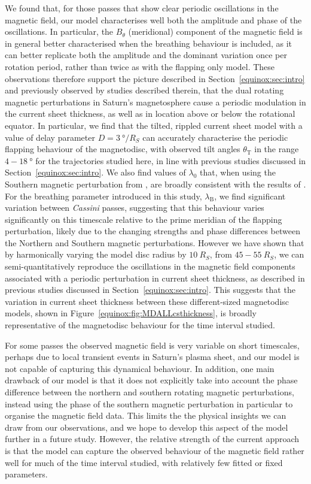 We found that, for those passes that show clear periodic oscillations in the magnetic field, our model characterises well both the amplitude and phase of the oscillations. In particular, the $B_\theta$ (meridional) component of the magnetic field is in general better characterised when the breathing behaviour is included, as it can better replicate both the amplitude and the dominant variation once per rotation period, rather than twice as with the flapping only model. These observations therefore support the picture described in Section~\ref{equinox:sec:intro} and previously observed by studies described therein, that the dual rotating magnetic perturbations in Saturn's magnetosphere cause a periodic modulation in the current sheet thickness, as well as in location above or below the rotational equator. In particular, we find that the \citet{arridge2011} tilted, rippled current sheet model with a value of delay parameter $D = \SI{3}{\degree/R_S}$ can accurately characterise the periodic flapping behaviour of the magnetodisc, with observed tilt angles $\theta_\mathrm{T}$ in the range $4-\SI{18}{\degree}$ for the trajectories studied here, in line with previous studies discussed in Section~\ref{equinox:sec:intro}. We also find values of $\lambda_0$ that, when using the Southern magnetic perturbation from \citet{andrews2012}, are broadly consistent with the results of \citet{arridge2011}. For the breathing parameter introduced in this study, $\lambda_\mathrm{B}$, we find significant variation between \textit{Cassini }passes, suggesting that this behaviour varies significantly on this timescale relative to the prime meridian of the flapping perturbation, likely due to the changing strengths and phase differences between the Northern and Southern magnetic perturbations. However we have shown that by harmonically varying the model disc radius by $\SI{10}{R_S}$, from $45-\SI{55}{R_S}$, we can semi-quantitatively reproduce the oscillations in the magnetic field components associated with a periodic perturbation in current sheet thickness, as described in previous studies discussed in Section~\ref{equinox:sec:intro}. This suggests that the variation in current sheet thickness between these different-sized magnetodisc models, shown in Figure~\ref{equinox:fig:MDALLcsthickness}, is broadly representative of the magnetodisc behaviour for the time interval studied.

For some passes the observed magnetic field is very variable on short timescales, perhaps due to local transient events in Saturn's plasma sheet, and our model is not capable of capturing this dynamical behaviour. In addition, one main drawback of our model is that it does not explicitly take into account the phase difference between the northern and southern rotating magnetic perturbations, instead using the phase of the southern magnetic perturbation in particular to organise the magnetic field data. This limits the the physical insights we can draw from our observations, and we hope to develop this aspect of the model further in a future study. However, the relative strength of the current approach is that the model can capture the observed behaviour of the magnetic field rather well for much of the time interval studied, with relatively few fitted or fixed parameters.

